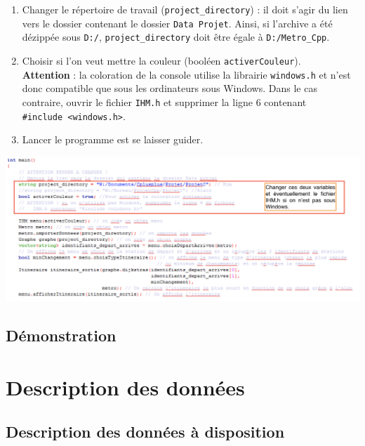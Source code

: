 \documentclass[,french]{article}
\begin{document}
\begin{enumerate}
\def\labelenumi{\arabic{enumi}.}
\item
  Changer le répertoire de travail (\texttt{project\_directory}) : il
  doit s'agir du lien vers le dossier contenant le dossier
  \texttt{Data\ Projet}. Ainsi, si l'archive a été dézippée sous
  \texttt{D:/}, \texttt{project\_directory} doit être égale à
  \texttt{D:/Metro\_Cpp}.
\item
  Choisir si l'on veut mettre la couleur (booléen
  \texttt{activerCouleur}).\\
  \bcattention  \textbf{Attention} : la coloration de la console utilise
  la librairie \texttt{windows.h} et n'est donc compatible que sous les
  ordinateurs sous Windows. Dans le cas contraire, ouvrir le fichier
  \texttt{IHM.h} et supprimer la ligne 6 contenant
  \texttt{\#include\ \textless{}windows.h\textgreater{}}.
\item
  Lancer le programme est se laisser guider.
\end{enumerate}

\includegraphics{img/main.png}

\hypertarget{duxe9monstration}{%
\subsection{Démonstration}\label{duxe9monstration}}

\hypertarget{sec:def_donnees}{%
\section{Description des données}\label{sec:def_donnees}}

\hypertarget{description-des-donnuxe9es-uxe0-disposition}{%
\subsection{Description des données à
disposition}\label{description-des-donnuxe9es-uxe0-disposition}}
\end{document}
